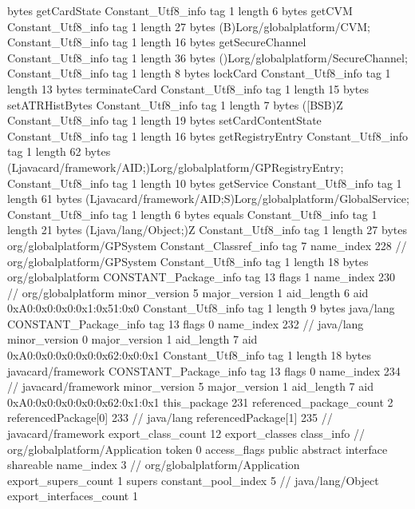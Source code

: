 {{{			bytes	getCardState
		}
		Constant_Utf8_info {
			tag	1
			length	6
			bytes	getCVM
		}
		Constant_Utf8_info {
			tag	1
			length	27
			bytes	(B)Lorg/globalplatform/CVM;
		}
		Constant_Utf8_info {
			tag	1
			length	16
			bytes	getSecureChannel
		}
		Constant_Utf8_info {
			tag	1
			length	36
			bytes	()Lorg/globalplatform/SecureChannel;
		}
		Constant_Utf8_info {
			tag	1
			length	8
			bytes	lockCard
		}
		Constant_Utf8_info {
			tag	1
			length	13
			bytes	terminateCard
		}
		Constant_Utf8_info {
			tag	1
			length	15
			bytes	setATRHistBytes
		}
		Constant_Utf8_info {
			tag	1
			length	7
			bytes	([BSB)Z
		}
		Constant_Utf8_info {
			tag	1
			length	19
			bytes	setCardContentState
		}
		Constant_Utf8_info {
			tag	1
			length	16
			bytes	getRegistryEntry
		}
		Constant_Utf8_info {
			tag	1
			length	62
			bytes	(Ljavacard/framework/AID;)Lorg/globalplatform/GPRegistryEntry;
		}
		Constant_Utf8_info {
			tag	1
			length	10
			bytes	getService
		}
		Constant_Utf8_info {
			tag	1
			length	61
			bytes	(Ljavacard/framework/AID;S)Lorg/globalplatform/GlobalService;
		}
		Constant_Utf8_info {
			tag	1
			length	6
			bytes	equals
		}
		Constant_Utf8_info {
			tag	1
			length	21
			bytes	(Ljava/lang/Object;)Z
		}
		Constant_Utf8_info {
			tag	1
			length	27
			bytes	org/globalplatform/GPSystem
		}
		Constant_Classref_info {
			tag	7
			name_index	228		// org/globalplatform/GPSystem
		}
		Constant_Utf8_info {
			tag	1
			length	18
			bytes	org/globalplatform
		}
		CONSTANT_Package_info {
			tag	13
			flags	1
			name_index	230		// org/globalplatform
			minor_version	5
			major_version	1
			aid_length	6
			aid	0xA0:0x0:0x0:0x1:0x51:0x0
		}
		Constant_Utf8_info {
			tag	1
			length	9
			bytes	java/lang
		}
		CONSTANT_Package_info {
			tag	13
			flags	0
			name_index	232		// java/lang
			minor_version	0
			major_version	1
			aid_length	7
			aid	0xA0:0x0:0x0:0x0:0x62:0x0:0x1
		}
		Constant_Utf8_info {
			tag	1
			length	18
			bytes	javacard/framework
		}
		CONSTANT_Package_info {
			tag	13
			flags	0
			name_index	234		// javacard/framework
			minor_version	5
			major_version	1
			aid_length	7
			aid	0xA0:0x0:0x0:0x0:0x62:0x1:0x1
		}
	}
	this_package	231
	referenced_package_count	2
	referencedPackage[0]	233		// java/lang
	referencedPackage[1]	235		// javacard/framework
	export_class_count	12
	export_classes {
		class_info {		// org/globalplatform/Application
			token	0
			access_flags	public abstract interface shareable
			name_index	3		// org/globalplatform/Application
			export_supers_count	1
			supers {
				constant_pool_index	5		// java/lang/Object
			}
			export_interfaces_count	1
}}}

